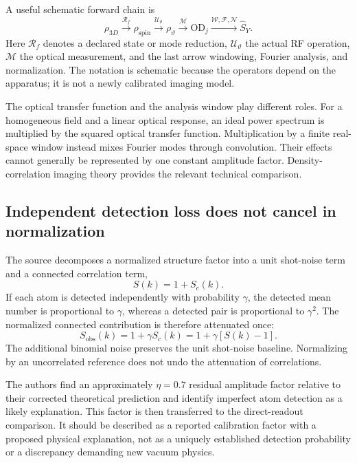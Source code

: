 \documentclass[11pt,a4paper]{article}
\theoremstyle{definition}
\theoremstyle{remark}
\begin{document}
A useful schematic forward chain is
\begin{equation}
 \rho_{3D}\xrightarrow{\mathcal R_f}\rho_{\mathrm{spin}}
 \xrightarrow{\mathcal U_\vartheta}\rho_\vartheta
 \xrightarrow{\mathcal M}\mathrm{OD}_j
 \xrightarrow{\mathcal W,\mathcal F,\mathcal N}\widehat S_Y.
 \label{eq:measurement_chain}
\end{equation}
Here $\mathcal R_f$ denotes a declared state or mode reduction, $\mathcal U_\vartheta$ the actual RF operation, $\mathcal M$ the optical measurement, and the last arrow windowing, Fourier analysis, and normalization. The notation is schematic because the operators depend on the apparatus; it is not a newly calibrated imaging model.

The optical transfer function and the analysis window play different roles. For a homogeneous field and a linear optical response, an ideal power spectrum is multiplied by the squared optical transfer function. Multiplication by a finite real-space window instead mixes Fourier modes through convolution. Their effects cannot generally be represented by one constant amplitude factor. Density-correlation imaging theory provides the relevant technical comparison.\cite{hung}

\subsection{Independent detection loss does not cancel in normalization}
The source decomposes a normalized structure factor into a unit shot-noise term and a connected correlation term,
\begin{equation}
 S(k)=1+S_c(k).
 \label{eq:structure_split}
\end{equation}
If each atom is detected independently with probability $\gamma$, the detected mean number is proportional to $\gamma$, whereas a detected pair is proportional to $\gamma^2$. The normalized connected contribution is therefore attenuated once:
\begin{equation}
 S_{\mathrm{obs}}(k)=1+\gamma S_c(k)
 =1+\gamma[S(k)-1].
 \label{eq:thinning}
\end{equation}
The additional binomial noise preserves the unit shot-noise baseline. Normalizing by an uncorrelated reference does not undo the attenuation of correlations.\cite{zhang2026}

The authors find an approximately $\eta=0.7$ residual amplitude factor relative to their corrected theoretical prediction and identify imperfect atom detection as a likely explanation. This factor is then transferred to the direct-readout comparison. It should be described as a reported calibration factor with a proposed physical explanation, not as a uniquely established detection probability or a discrepancy demanding new vacuum physics.\cite{zhang2026}
\end{document}
